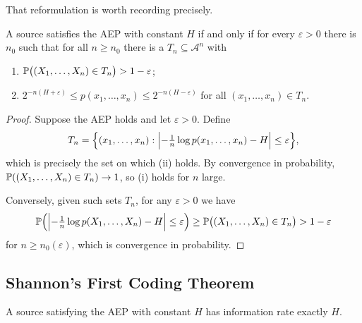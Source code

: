 \documentclass[a4paper]{scrartcl}
\newcommand{\Ac}{\mathcal{A}}
\begin{document}
That reformulation is worth recording precisely.

\begin{lemma}\label{lem:typical}
	A source satisfies the AEP with constant $H$ if and only if for every $\varepsilon>0$ there is $n_0$ such that for all $n \ge n_0$ there is a  $T_n \subseteq \Ac^n$ with
	\begin{enumerate}[label=(\roman*)]
		\item $\mathbb{P}\bigl((X_1,\dots,X_n) \in T_n\bigr) > 1-\varepsilon$;
		\item $2^{-n(H+\varepsilon)} \le p(x_1,\dots,x_n) \le 2^{-n(H-\varepsilon)}$ for all $(x_1,\dots,x_n) \in T_n$.
	\end{enumerate}
\end{lemma}

\begin{proof}
	Suppose the AEP holds and let $\varepsilon>0$. Define
	$$T_n = \Bigl\{(x_1,\dots,x_n) : \Bigl\lvert-\tfrac1n \log p(x_1,\dots,x_n) - H\Bigr\rvert \le \varepsilon\Bigr\},$$
	which is precisely the set on which (ii) holds. By convergence in probability, $\mathbb{P}((X_1,\dots,X_n)\in T_n) \to 1$, so (i) holds for $n$ large.

	Conversely, given such sets $T_n$, for any $\varepsilon > 0$ we have
	$$\mathbb{P}\Bigl(\Bigl\lvert-\tfrac1n\log p(X_1,\dots,X_n)-H\Bigr\rvert \le \varepsilon\Bigr) \ge \mathbb{P}\bigl((X_1,\dots,X_n)\in T_n\bigr) > 1-\varepsilon$$
	for $n \ge n_0(\varepsilon)$, which is convergence in probability.
\end{proof}

\subsection{Shannon's First Coding Theorem}

\begin{theorem}\label{thm:firstcoding}
	A source satisfying the AEP with constant $H$ has information rate exactly $H$.
\end{theorem}
\end{document}

